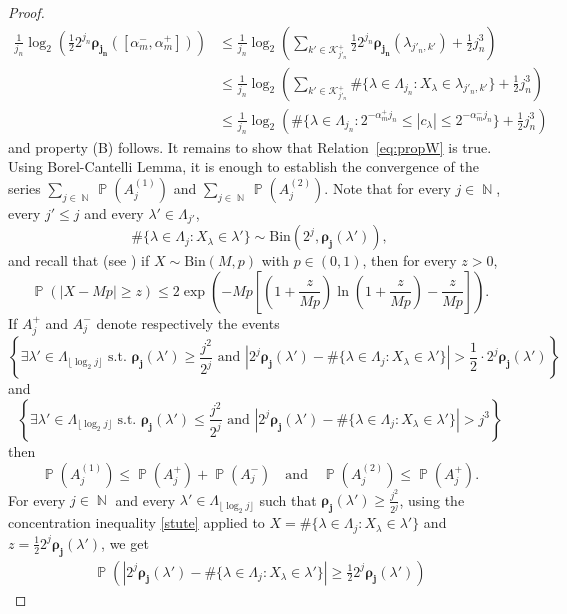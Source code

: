 \documentclass[a4paper,11pt,oneside]{article}
\DeclareMathOperator{\N}{\mathbb{N}}
\DeclareMathOperator{\prob}{\mathbb{P}}
\newcommand{\ccint}[1]{\left[{#1}\right]}
\newcommand{\ooint}[1]{\left({#1}\right)}
\newcommand{\modu}[1]{\left\vert{#1}\right\vert}
\theoremstyle{definition}
\theoremstyle{plain}
\begin{document}
\begin{proof}
\begin{align*}
\frac{1}{j_n}\log_2\left(\frac{1}{2} 2^{j_n}\bm{\rho_{j_n}}(\ccint{\alpha_m^-,\alpha_m^+})\right)
& \leq \frac{1}{j_n}\log_2\left(\sum_{k'\in\mathcal{K}^+_{j'_n}}\frac{1}{2} 2^{j_n}\bm{\rho_{j_n}}(\lambda_{j'_n,k'})+\frac{1}{2} j_n^3\right) \\
& \leq\frac{1}{j_n} \log_2\left(\sum_{k'\in\mathcal{K}^+_{j'_n}}\#\{\lambda\in\Lambda_{j_n}:X_\lambda\in\lambda_{j'_n,k'}\}+\frac{1}{2} j_n^3\right) \\
& \leq \frac{1}{j_n}\log_2\left(\#\{\lambda\in\Lambda_{j_n}:2^{-\alpha_m^+j_n}\leq\modu{c_\lambda}\leq2^{-\alpha_m^-j_n}\}+\frac{1}{2} j_n^3\right)
\end{align*}
and property (B) follows. It remains to show that Relation~\eqref{eq:propW} is true. Using Borel-Cantelli Lemma, it is enough to establish the convergence of the series
$\sum_{j\in\N}\prob\left(A_j^{(1)}\right)$ and $\sum_{j\in\N}\prob\left(A_j^{(2)}\right)$. Note that for every $j\in\N$, every $j'\leq j$ and every $\lambda'\in\Lambda_{j'}$, 
\[
\#\{\lambda\in\Lambda_j:X_\lambda\in \lambda'\}\sim \text{Bin}(2^j,\bm{\rho_j}(\lambda')),
\]
and recall that (see \cite{stute}) if $X\sim\text{Bin}(M,p)$ with $p\in\ooint{0,1}$, then for every $z>0$,
\begin{equation}\label{stute}
\prob(\modu{X-Mp}\geq z) \leq 2\exp\left(-Mp\left[\left(1+\frac{z}{Mp}\right)\ln\left(1+\frac{z}{Mp}\right)-\frac{z}{Mp}\right]\right).
\end{equation}
If $A_j^+$ and $A_j^-$ denote respectively the events
\[
\left\{\exists \lambda'\in\Lambda_{\lfloor \log_2j\rfloor}\text{ s.t. }\bm{\rho_j}(\lambda')\geq\frac{j^2}{2^j}\text{ and }\modu{2^j\bm{\rho_j}(\lambda')-\#\{\lambda\in\Lambda_j:X_\lambda\in\lambda'\}}> \frac{1}{2}\cdot2^j\bm{\rho_j}(\lambda')\right\}
\]
and
\[
\left\{\exists \lambda'\in\Lambda_{\lfloor \log_2j\rfloor}\text{ s.t. }\bm{\rho_j}(\lambda')\leq\frac{j^2}{2^j}\text{ and }\modu{2^j\bm{\rho_j}(\lambda')-\#\{\lambda\in\Lambda_j:X_\lambda\in\lambda'\}}> j^3\right\}
\]
then
\[
\prob\left(A_j^{(1)}\right)\leq\prob\left(A_j^+\right)+\prob\left(A_j^-\right)\quad\text{and}\quad \prob\left(A_j^{(2)}\right)\leq \prob\left(A_j^+\right).
\]
For every $j\in\N$ and every $\lambda'\in\Lambda_{\lfloor\log_2j\rfloor}$ such that $\bm{\rho_j}(\lambda')\geq\frac{j^2}{2^j}$, using the concentration inequality \eqref{stute} applied to $X=\#\{\lambda\in\Lambda_j:X_\lambda\in\lambda'\}$ and $z=\frac{1}{2}2^j\bm{\rho_j}(\lambda')$, we get
\begin{align*}
\prob\left(\modu{2^j\bm{\rho_j}(\lambda')-\#\{\lambda\in\Lambda_j:X_\lambda\in\lambda'\}}\geq\frac{1}{2} 2^j\bm{\rho_j}(\lambda')\right)

\end{align*}
\end{proof}
\end{document}
